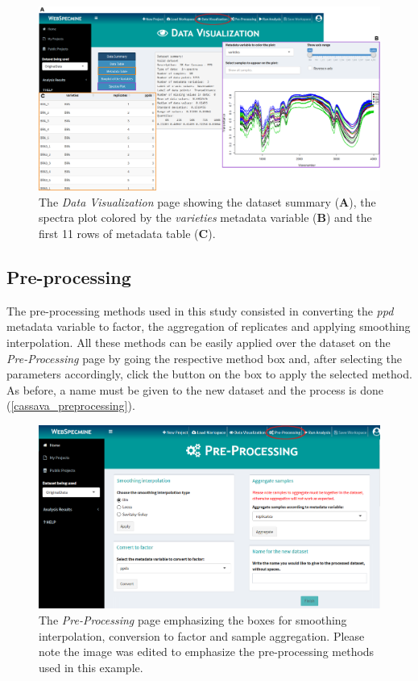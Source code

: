 \begin{figure}[h]
	\centering
	\includegraphics[width=1\linewidth]{Imagens/CassavaPPD/data_overview}
	\caption{The \textit{Data Visualization} page showing the dataset summary (\textbf{A}), the spectra plot colored by the \textit{varieties} metadata variable (\textbf{B}) and the first 11 rows of metadata table (\textbf{C}).}
	\label{cassava_data_overview}
\end{figure}


\subsection{Pre-processing}

The pre-processing methods used in this study consisted in converting the \textit{ppd} metadata variable to factor, the aggregation of replicates and applying smoothing interpolation. All these methods can be easily applied over the dataset on the \textit{Pre-Processing} page by going the respective method box and, after selecting the parameters accordingly, click the button on the box to apply the selected method. 
As before, a name must be given to the new dataset and the process is done (\autoref{cassava_preprocessing}).

\begin{figure}[H]
	\centering
	\includegraphics[width=0.8\linewidth]{Imagens/CassavaPPD/preprocessing}
	\caption{The \textit{Pre-Processing} page emphasizing the boxes for smoothing interpolation, conversion to factor and sample aggregation. Please note the image was edited to emphasize the pre-processing methods used in this example.}
	\label{cassava_preprocessing}
\end{figure}


